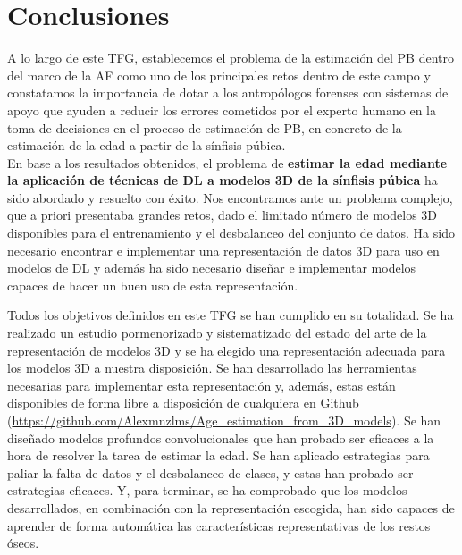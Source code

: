 \chapter{Conclusiones}
\label{chap:conclusiones}

A lo largo de este TFG, establecemos el problema de la estimación del PB dentro del marco de la AF como uno de los principales retos dentro de este campo y constatamos la importancia de dotar a los antropólogos forenses con sistemas de apoyo que ayuden a reducir los errores cometidos por el experto humano en la toma de decisiones en el proceso de estimación de PB, en concreto de la estimación de la edad a partir de la sínfisis púbica.\\

En base a los resultados obtenidos, el problema de \textbf{estimar la edad mediante la aplicación de técnicas de DL a modelos 3D de la sínfisis púbica} ha sido abordado y resuelto con éxito. Nos encontramos ante un problema complejo, que a priori presentaba grandes retos, dado el limitado número de modelos 3D disponibles para el entrenamiento y el desbalanceo del conjunto de datos. Ha sido necesario encontrar e implementar una representación de datos 3D para uso en modelos de DL y además ha sido necesario diseñar e implementar modelos capaces de hacer un buen uso de esta representación.

Todos los objetivos definidos en este TFG se han cumplido en su totalidad. Se ha realizado un estudio pormenorizado y sistematizado del estado del arte de la representación de modelos 3D y se ha elegido una representación adecuada para los modelos 3D a nuestra disposición. Se han desarrollado las herramientas necesarias para implementar esta representación y, además, estas están disponibles de forma libre a disposición de cualquiera en Github (\url{https://github.com/Alexmnzlms/Age_estimation_from_3D_models}). Se han diseñado modelos profundos convolucionales que han probado ser eficaces a la hora de resolver la tarea de estimar la edad. Se han aplicado estrategias para paliar la falta de datos y el desbalanceo de clases, y estas han probado ser estrategias eficaces. Y, para terminar, se ha comprobado que los modelos desarrollados, en combinación con la representación escogida, han sido capaces de aprender de forma automática las características representativas de los restos óseos.\\

